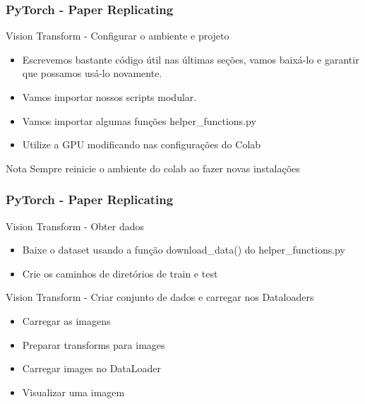 \documentclass{beamer}
\begin{document}
\begin{frame}
	\frametitle{PyTorch - Paper Replicating}
	\begin{block}{Vision Transform - Configurar o ambiente e projeto}
		\begin{itemize}
			\item Escrevemos bastante código útil nas últimas seções, vamos baixá-lo e garantir que possamos usá-lo novamente.
			\item Vamos importar nossos scripts modular.
			\item Vamos importar algumas funções helper\_functions.py
			\item Utilize a GPU modificando nas configurações do Colab
		\end{itemize}
	\end{block}
	\begin{alertblock}{Nota}
		Sempre reinicie o ambiente do colab ao fazer novas instalações
	\end{alertblock}
\end{frame}
\begin{frame}
	\frametitle{PyTorch - Paper Replicating}
	\begin{block}{Vision Transform - Obter dados}
		\begin{itemize}
			\item Baixe o dataset usando a função download\_data() do helper\_functions.py
			\item Crie os caminhos de diretórios de train e test
		\end{itemize}
	\end{block}
	\begin{block}{Vision Transform - Criar conjunto de dados e carregar nos Dataloaders}
		\begin{itemize}
			\item Carregar as imagens
			\item Preparar transforms para images
			\item Carregar images no DataLoader
			\item Visualizar uma imagem
		\end{itemize}
	\end{block}
\end{frame} 
\end{document}
